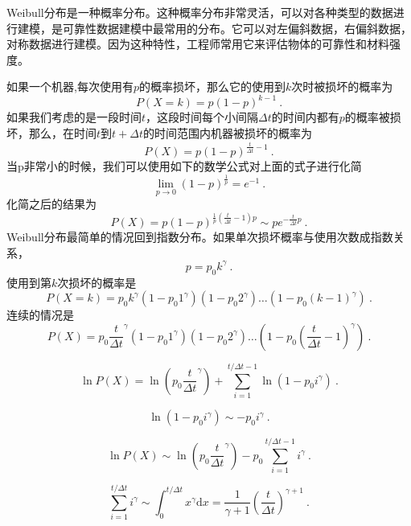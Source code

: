 
Weibull分布是一种概率分布。这种概率分布非常灵活，可以对各种类型的数据进行建模，是可靠性数据建模中最常用的分布。它可以对左偏斜数据，右偏斜数据，对称数据进行建模。因为这种特性，工程师常用它来评估物体的可靠性和材料强度。

如果一个机器,每次使用有$p$的概率损坏，那么它的使用到$k$次时被损坏的概率为
\begin{equation}
P(X=k)=p(1-p)^{k-1}~.
\end{equation}
如果我们考虑的是一段时间$t$，这段时间每个小间隔$\Delta t$的时间内都有$p$的概率被损坏，那么，在时间$t$到$t+\Delta t$的时间范围内机器被损坏的概率为
\begin{equation}
P(X)=p(1-p)^{\frac{t}{\Delta t}-1}~.
\end{equation}
当p非常小的时候，我们可以使用如下的数学公式对上面的式子进行化简
\begin{equation}
\lim _{p \rightarrow 0}(1-p)^{\frac{1}{p}}=e^{-1}~.
\end{equation}
化简之后的结果为
\begin{equation}
P(X)=p(1-p)^{\frac{1}{p}\left(\frac{t}{\Delta t}-1\right) p} \sim p e^{-\frac{t}{\Delta t} p}~.
\end{equation}
Weibull分布最简单的情况回到指数分布。如果单次损坏概率与使用次数成指数关系，
\begin{equation}
p=p_0 k^\gamma~.
\end{equation}
使用到第$k$次损坏的概率是
\begin{equation}
P(X=k)=p_0 k^\gamma\left(1-p_0 1^\gamma\right)\left(1-p_0 2^\gamma\right) \ldots\left(1-p_0(k-1)^\gamma\right)~.
\end{equation}
连续的情况是
\begin{equation}
P(X)=p_0 \frac{t}{\Delta t}^\gamma\left(1-p_0 1^\gamma\right)\left(1-p_0 2^\gamma\right) \ldots\left(1-p_0\left(\frac{t}{\Delta t}-1\right)^\gamma\right)~.
\end{equation}

\begin{equation}
\ln P(X)=\ln \left(p_0 \frac{t}{\Delta t}^\gamma\right)+\sum_{i=1}^{t / \Delta t-1} \ln \left(1-p_0 i^\gamma\right)~.
\end{equation}

\begin{equation}
\ln \left(1-p_0 i^\gamma\right) \sim-p_0 i^\gamma~.
\end{equation}

\begin{equation}
\ln P(X) \sim \ln \left(p_0 \frac{t}{\Delta t}^\gamma\right)-p_0 \sum_{i=1}^{t / \Delta t-1} i^\gamma~.
\end{equation}

\begin{equation}
\sum_{i=1}^{t / \Delta t} i^\gamma \sim \int_0^{t / \Delta t} x^\gamma \mathrm{d} x=\frac{1}{\gamma+1}\left(\frac{t}{\Delta t}\right)^{\gamma+1}~.
\end{equation}
